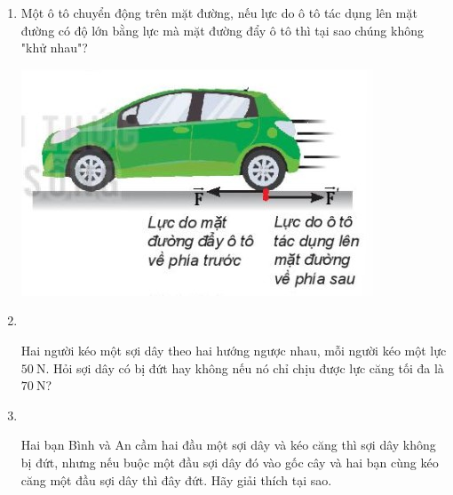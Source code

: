 \begin{enumerate}[label=\bfseries Bài \arabic*:]
\item {}

{
	
	Một ô tô chuyển động trên mặt đường, nếu lực do ô tô tác dụng lên mặt đường có độ lớn bằng lực mà mặt đường đẩy ô tô thì tại sao chúng không "khử nhau"?
	\begin{center}
		\includegraphics[scale=0.6]{../figs/VN10-2022-PH-TP017-4.jpg}
	\end{center}
}




	\item {}\\
	{Hai người kéo một sợi dây theo hai hướng ngược nhau, mỗi người kéo một lực $\SI{50}{\newton}$. Hỏi sợi dây có bị đứt hay không nếu nó chỉ chịu được lực căng tối đa là $\SI{70}{\newton}$?
	
}

\item{}\\
{Hai bạn Bình và An cầm hai đầu một sợi dây và kéo căng thì sợi dây không bị đứt, nhưng nếu buộc một đầu sợi dây đó vào gốc cây và hai bạn cùng kéo căng một đầu sợi dây thì đây đứt. Hãy giải thích tại sao.

}
\end{enumerate}
